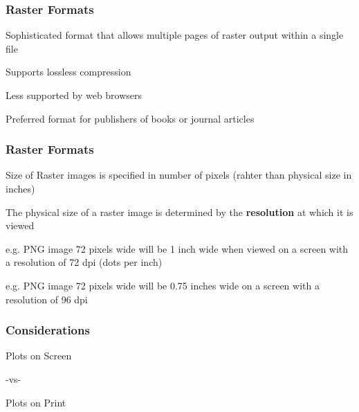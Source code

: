\documentclass[12pt]{beamer}\usepackage[]{graphicx}\usepackage[]{color}
\begin{document}

\begin{frame}
\frametitle{Raster Formats}

\bi
  \item Sophisticated format that allows multiple pages of raster 
  output within a single file
  \item Supports lossless compression
  \item Less supported by web browsers
  \item Preferred format for publishers of books or journal articles
\ei
\eb

\end{frame}


\begin{frame}
\frametitle{Raster Formats}

\bi
  \item Size of Raster images is specified in number of pixels 
  (rahter than physical size in inches)
  \item The physical size of a raster image is determined by the 
  \textbf{resolution} at which it is viewed
  \item e.g. PNG image 72 pixels wide will be 1 inch wide when viewed 
  on a screen with a resolution of 72 dpi (dots per inch)
  \item e.g. PNG image 72 pixels wide will be 0.75 inches wide on a screen 
  with a resolution of 96 dpi
\ei
\eb

\end{frame}


\begin{frame}[c]
\frametitle{Considerations}

\centering
{\Large \mdlit Plots on Screen}

\vspace{18pt}

-vs-

\vspace{18pt}

{\Large \mdlit Plots on Print}

\end{frame}

\end{document}
